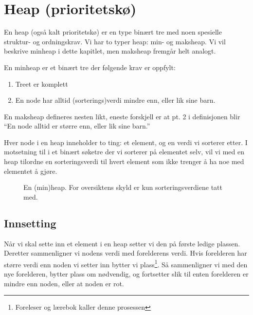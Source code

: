 \section{Heap (prioritetskø)}\label{heap}
En heap (også kalt prioritetskø) er en type binært tre med noen spesielle struktur- og ordningskrav. Vi har to typer heap: min- og maksheap. Vi vil beskrive minheap i dette kapitlet, men maksheap fremgår helt analogt.

\begin{definition} En minheap er et binært tre der følgende krav er oppfylt:  \label{def:heap}
\begin{enumerate}
\item Treet er komplett
\item En node har alltid (sorterings)verdi mindre enn, eller lik sine barn. 
\end{enumerate}
\end{definition}

En maksheap defineres nesten likt, eneste forskjell er at pt. 2 i definisjonen blir ``En node alltid er større enn, eller lik sine barn.''

Hver node i en heap inneholder to ting: et element, og en verdi vi sorterer etter. I motsetning til i et binært søketre der vi sorterer på elementet selv, vil vi med en heap tilordne en sorteringsverdi til hvert element som ikke trenger å ha noe med elementet å gjøre. 


\begin{figure}[h!]
\centering
\caption{En (min)heap. For oversiktens skyld er kun sorteringsverdiene tatt med.}
\label{fig:heap}
\end{figure}


\subsection{Innsetting}
Når vi skal sette inn et element i en heap setter vi den på første ledige plassen. Deretter sammenligner vi nodens verdi med forelderens verdi. Hvis forelderen har større verdi enn noden vi setter inn bytter vi plass\footnote{Foreleser og lærebok kaller denne prosessen }. Så sammenligner vi med den nye forelderen, bytter plass om nødvendig, og fortsetter slik til enten forelderen er mindre enn noden, eller at noden er rot. 


